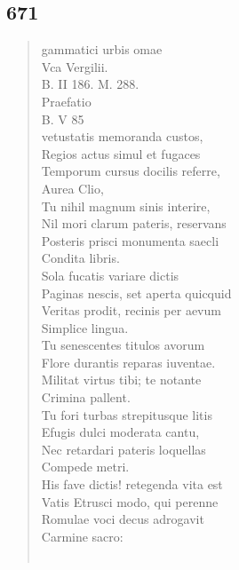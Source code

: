 \documentclass[11pt, a4paper]{report}
\begin{document}
            \subsection*{671}
      \begin{verse}
      gammatici urbis omae \\ Vca Vergilii. \\ B. II 186. M. 288. \\ Praefatio \\ B. V 85 \\ vetustatis memoranda custos, \\ Regios actus simul et fugaces \\ Temporum cursus docilis referre, \\ Aurea Clio, \\ Tu nihil magnum sinis interire, \\ Nil mori clarum pateris, reservans \\ Posteris prisci monumenta saecli \\ Condita libris. \\ Sola fucatis variare dictis \\ Paginas nescis, set aperta quicquid \\ Veritas prodit, recinis per aevum \\ Simplice lingua. \\ Tu senescentes titulos avorum \\ Flore durantis reparas iuventae. \\ Militat virtus tibi; te notante \\ Crimina pallent. \\ Tu fori turbas strepitusque litis \\ Efugis dulci moderata cantu, \\ Nec retardari pateris loquellas \\ Compede metri. \\ His fave dictis! retegenda vita est \\ Vatis Etrusci modo, qui perenne \\ Romulae voci decus adrogavit \\ Carmine sacro: \\ 
        ﻿\pagebreak 

\end{verse}
\end{document}
